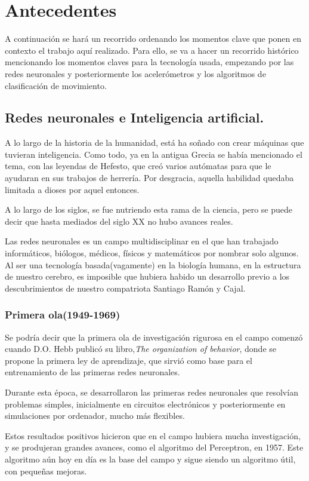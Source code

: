 \documentclass[12pt]{article}
\numberwithin{equation}{section}
\begin{document}
\section{Antecedentes}
A continuación se hará un recorrido ordenando los momentos clave que ponen en contexto el trabajo aquí realizado. Para ello, se va a hacer un recorrido histórico mencionando los momentos claves para la tecnología usada, empezando por las redes neuronales y posteriormente los acelerómetros y los algoritmos de clasificación de movimiento.
\subsection{Redes neuronales e Inteligencia artificial.}
A lo largo de la historia de la humanidad, está ha soñado con crear máquinas que tuvieran inteligencia. Como todo, ya en la antigua Grecia se había mencionado el tema, con las leyendas de Hefesto, que creó varios autómatas para que le ayudaran en sus trabajos de herrería. Por  desgracia, aquella habilidad quedaba limitada a dioses por aquel entonces.

A lo largo de los siglos, se fue nutriendo esta rama de la ciencia, pero se puede decir que hasta mediados del siglo XX no hubo avances reales.

Las redes neuronales es un campo multidisciplinar en el que han trabajado informáticos, biólogos, médicos, físicos y matemáticos por nombrar solo algunos. Al ser una tecnología basada(vagamente) en la biología humana, en la estructura de nuestro cerebro, es imposible que hubiera habido un desarrollo previo a los descubrimientos de nuestro compatriota Santiago Ramón y Cajal.

\subsubsection{Primera ola(1949-1969)}

Se podría decir que la primera ola de investigación rigurosa en el campo comenzó cuando D.O. Hebb publicó su libro,\textit{The organization of behavior}, donde se propone la primera ley de aprendizaje, que sirvió como base para el entrenamiento de las primeras redes neuronales.

Durante esta época, se desarrollaron las primeras redes neuronales que resolvían problemas simples, inicialmente en circuitos electrónicos y posteriormente en simulaciones por ordenador, mucho más flexibles.

Estos resultados positivos hicieron que en el campo hubiera mucha investigación, y se produjeran grandes avances, como el algoritmo del Perceptron, en 1957\cite{rosenblatt1957perceptron}. Este algoritmo aún hoy en día es la base del campo y sigue siendo un algoritmo útil, con pequeñas mejoras.
\end{document}
